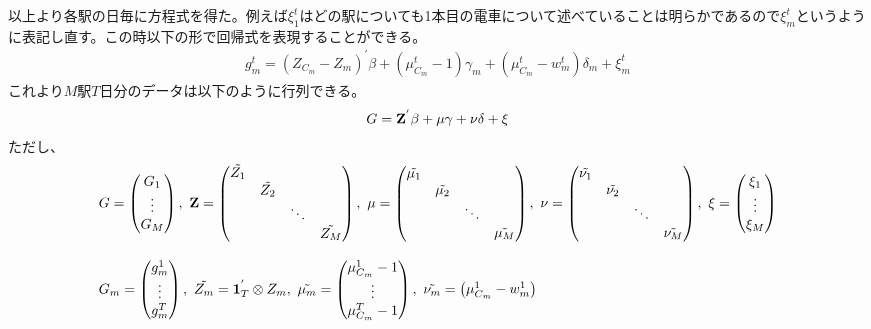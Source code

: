 \documentclass{jsarticle}
\begin{document}
以上より各駅の日毎に方程式を得た。例えば$\xi_1^t$はどの駅についても1本目の電車について述べていることは明らかであるので$\xi_m^t$というように表記し直す。この時以下の形で回帰式を表現することができる。
\begin{align*}
	g_m^t = (Z_{C_m} - Z_m)^{'} \beta + \left(\mu_{C_m}^t-1\right)\gamma_m + (\mu_{C_m}^t - w_m^t)\delta_m + \xi_m^t
\end{align*}
これより$M$駅$T$日分のデータは以下のように行列できる。
\begin{align*}
	G = {\bf Z}^{'}\beta + {\bf \mu} \gamma + {\bf \nu} \delta + \xi
\end{align*}
ただし、
\begin{align*}
	&G = \begin{pmatrix} G_1\\
	\vdots\\
	G_M\end{pmatrix},\ {\bf Z} = \begin{pmatrix} \tilde{Z_1}&&&\\
	&\tilde{Z_2}&&\\
	&&\ddots&\\
	&&&\tilde{Z_M}
	\end{pmatrix},\ {\bf \mu} =  \begin{pmatrix} \tilde{\mu_1}&&&\\
	&\tilde{\mu_2}&&\\
	&&\ddots&\\
	&&&\tilde{\mu_M}
	\end{pmatrix},\ {\bf \nu} =  \begin{pmatrix} \tilde{\nu_1}&&&\\
	&\tilde{\nu_2}&&\\
	&&\ddots&\\
	&&&\tilde{\nu_M}
	\end{pmatrix},\ \xi = \begin{pmatrix} \xi_1\\
	\vdots\\
	\xi_M \end{pmatrix}\\[8pt]
	&G_m = \begin{pmatrix} g_m^1\\
	\vdots\\
	g_m^T\end{pmatrix},\ \tilde{Z_m} = {\bf 1}_{T}^{'}\otimes Z_m,\ \tilde{\mu_m} = \begin{pmatrix} \mu_{C_m}^1 - 1\\
	\vdots\\
	\mu_{C_m}^T - 1\end{pmatrix},\ \tilde{\nu_m} = \begin{pmatrix} \mu_{C_m}^1 - w_m^1\\

\end{pmatrix}
\end{align*}
\end{document}
